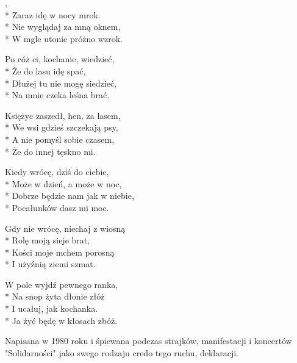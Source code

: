\begin{lyrics}[longestline={Dziś do ciebie przyjść nie mogę,}]

,\\*
Zaraz idę w nocy mrok.\\*
Nie wyglądaj za mną oknem,\\*
W mgle utonie próżno wzrok.

Po cóż ci, kochanie, wiedzieć,\\*
Że do lasu idę spać,\\*
Dłużej tu nie mogę siedzieć,\\*
Na mnie czeka leśna brać.

Księżyc zaszedł, hen, za lasem,\\*
We wsi gdzieś szczekają psy,\\*
A nie pomyśl sobie czasem,\\*
Że do innej tęskno mi.

Kiedy wrócę, dziś do ciebie,\\*
Może w dzień, a może w noc,\\*
Dobrze będzie nam jak w niebie,\\*
Pocałunków dasz mi moc.

Gdy nie wrócę, niechaj z wiosną\\*
Rolę moją sieje brat,\\*
Kości moje mchem porosną\\*
I użyźnią ziemi szmat.

W pole wyjdź pewnego ranka,\\*
Na snop żyta dłonie złóż\\*
I ucałuj, jak kochanka.\\*
Ja żyć będę w kłosach zbóż.
\end{lyrics}



\begin{info}Napisana w 1980 roku i śpiewana podczas strajków, manifestacji i koncertów "Solidarności" jako swego rodzaju credo tego ruchu, deklaracji. \end{info}


